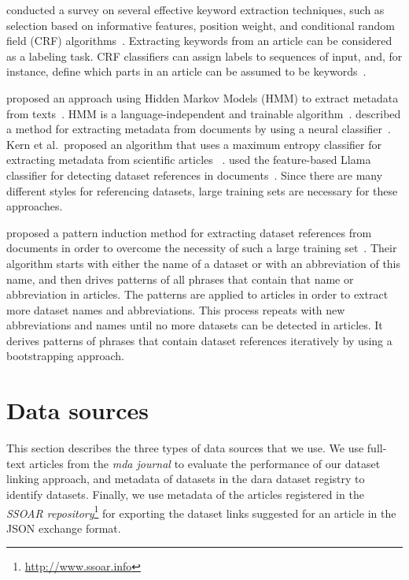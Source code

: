 \documentclass{IOS-Book-Article}
\newcommand{\dara}{\textsf{da\textbar ra}}
\begin{document}
\citeauthor{Kaur2010} conducted a survey on several effective keyword extraction techniques, such as selection based on informative features, position weight, and conditional random field (CRF) algorithms~\cite{Kaur2010}.
Extracting keywords from an article can be considered as a labeling task.
CRF classifiers can assign labels to sequences of input, and, for instance, define which parts in an article can be assumed to be keywords~\citep{ZHANG2008}.

\citeauthor{Cui2010} proposed an approach using Hidden Markov Models (HMM) to extract metadata from texts~\cite{Cui2010}. 
HMM is a language-independent and trainable algorithm~\cite{Kubala1998}.
\citeauthor{Marinai2009} described a method for extracting metadata from documents by using a neural classifier~\cite{Marinai2009}.
Kern et al.\ proposed an algorithm that uses a maximum entropy classifier for extracting metadata from scientific articles~
\cite{Kern2012}.
\citeauthor{MeiyuLu2012} used the feature-based Llama classifier for detecting dataset references in documents~\cite{MeiyuLu2012}.
Since there are many different styles for referencing datasets, large training sets are necessary for these approaches.

\citeauthor{Boland2012} proposed a pattern induction method for extracting dataset references from documents in order to overcome the necessity of such a large training set~\cite{Boland2012}.
Their algorithm starts with either the name of a dataset or with an abbreviation of this name, and then drives patterns of all phrases that contain that name or abbreviation in articles.
The patterns are applied to articles in order to extract more dataset names and abbreviations.
This process repeats with new abbreviations and names until no more datasets can be detected in articles.
It derives patterns of phrases that contain dataset references iteratively by using a bootstrapping approach.


\section{Data sources}
\label{sec:data}
This section describes the three types of data sources that we use. 
We use full-text articles from the \emph{mda journal} to evaluate the performance of our dataset linking approach, and metadata of datasets in the {\dara} dataset registry to identify datasets. 
Finally, we use metadata of the articles registered in the \emph{SSOAR repository}\footnote{\url{http://www.ssoar.info}} for exporting the dataset links suggested for an article in the JSON exchange format.
 
\end{document}
